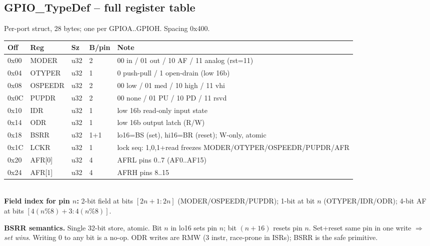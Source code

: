 \subsection{GPIO\_TypeDef -- full register table}
Per-port struct, 28 bytes; one per GPIOA..GPIOH. Spacing 0x400.
\begin{tabular}{@{}llllp{}@{}}
\toprule
\textbf{Off} & \textbf{Reg} & \textbf{Sz} & \textbf{B/pin} & \textbf{Note}\\
\midrule
0x00 & MODER   & u32 & 2 & 00 in / 01 out / 10 AF / 11 analog (rst=11)\\
0x04 & OTYPER  & u32 & 1 & 0 push-pull / 1 open-drain (low 16b)\\
0x08 & OSPEEDR & u32 & 2 & 00 low / 01 med / 10 high / 11 vhi\\
0x0C & PUPDR   & u32 & 2 & 00 none / 01 PU / 10 PD / 11 rsvd\\
0x10 & IDR     & u32 & 1 & low 16b read-only input state\\
0x14 & ODR     & u32 & 1 & low 16b output latch (R/W)\\
0x18 & BSRR    & u32 & 1+1 & lo16=BS (set), hi16=BR (reset); W-only, atomic\\
0x1C & LCKR    & u32 & 1 & lock seq: 1,0,1+read freezes MODER/OTYPER/OSPEEDR/PUPDR/AFR\\
0x20 & AFR[0]  & u32 & 4 & AFRL pins 0..7 (AF0..AF15)\\
0x24 & AFR[1]  & u32 & 4 & AFRH pins 8..15\\
\bottomrule
\end{tabular}\\
\textbf{Field index for pin $n$:} 2-bit field at bits $[2n+1{:}2n]$ (MODER/OSPEEDR/PUPDR); 1-bit at bit $n$ (OTYPER/IDR/ODR); 4-bit AF at  bits $[4(n\%8)+3{:}4(n\%8)]$.

\begin{reg}\textbf{BSRR semantics.} Single 32-bit store, atomic. Bit $n$ in lo16 sets pin $n$; bit $(n+16)$ resets pin $n$. Set+reset same pin in one write $\Rightarrow$ \emph{set wins}. Writing 0 to any bit is a no-op. ODR writes are RMW (3 instr, race-prone in ISRs); BSRR is the safe primitive.\end{reg}


